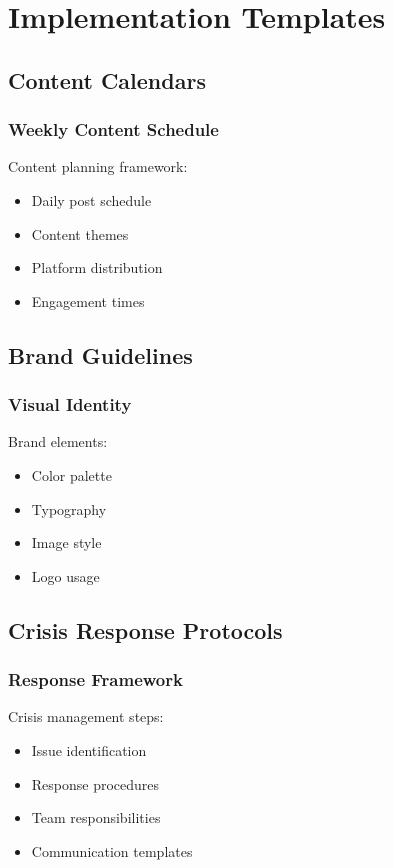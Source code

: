 \documentclass[12pt]{report}
\begin{document}
\chapter{Implementation Templates}

\section{Content Calendars}
\subsection{Weekly Content Schedule}
Content planning framework:
\begin{itemize}
    \item Daily post schedule
    \item Content themes
    \item Platform distribution
    \item Engagement times
\end{itemize}

\section{Brand Guidelines}
\subsection{Visual Identity}
Brand elements:
\begin{itemize}
    \item Color palette
    \item Typography
    \item Image style
    \item Logo usage
\end{itemize}

\section{Crisis Response Protocols}
\subsection{Response Framework}
Crisis management steps:
\begin{itemize}
    \item Issue identification
    \item Response procedures
    \item Team responsibilities
    \item Communication templates
\end{itemize}
\end{document}
